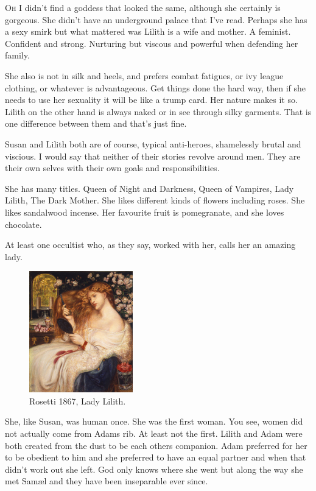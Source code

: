 \lettrine[lines=2,lraise=0]{O}h I didn't find a goddess that looked the same, although she certainly is gorgeous. She didn't have an underground palace that I've read. Perhaps she has a sexy smirk but what mattered was Lilith is a wife and mother. A feminist. Confident and strong. Nurturing but viscous and powerful when defending her family.

She also is not in silk and heels, and prefers combat fatigues, or ivy league clothing, or whatever is advantageous. Get things done the hard way, then if she needs to use her sexuality it will be like a trump card. Her nature makes it so. Lilith on the other hand is always naked or in see through silky garments. That is one difference between them and that's just fine. 

Susan and Lilith both are of course, typical anti-heroes, shamelessly brutal and viscious. I would say that neither of their stories revolve around men. They are their own selves with their own goals and responsibilities.

	
She has many titles. Queen of Night and Darkness, Queen of Vampires, Lady Lilith, The Dark Mother. She likes different kinds of flowers including roses. She likes sandalwood incense. Her favourite fruit is pomegranate, and she loves chocolate.

At least one occultist who, as they say, worked with her, calls her an amazing lady.


\begin{figure}
	\centering
	\includegraphics[width=0.40\textwidth]{Images/Rossetti_lady_lilith_1867.jpg}
	\\ {\small Rosetti 1867, Lady Lilith.}
\end{figure}


She, like Susan, was human once. She was the first woman. You see, women did not actually come from Adams rib. At least not the first. Lilith and Adam were both created from the dust to be each others companion. Adam preferred for her to be obedient to him and she preferred to have an equal partner and when that didn't work out she left. God only knows where she went but along the way she met Sam\ae l and they have been inseparable ever since.

